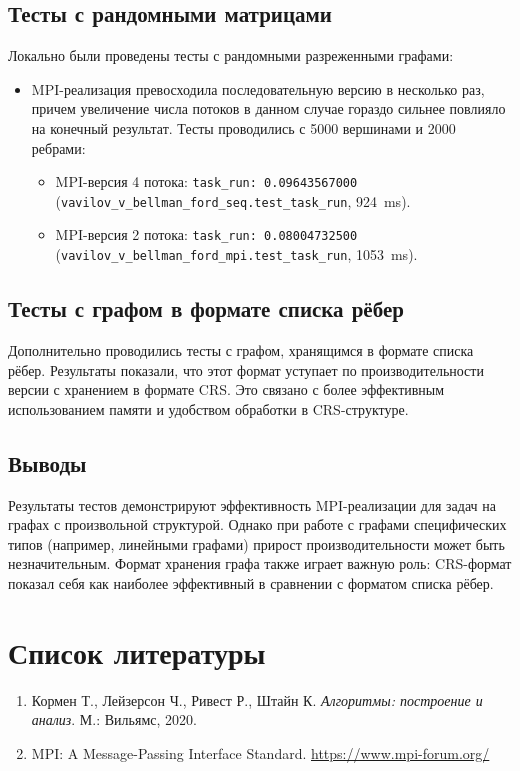 \documentclass[12pt]{article}
\begin{document}
\subsection{Тесты с рандомными матрицами}

Локально были проведены тесты с рандомными разреженными графами:
\begin{itemize}
    \item MPI-реализация превосходила последовательную версию в несколько раз, причем увеличение числа потоков в данном случае гораздо сильнее повлияло на конечный результат. Тесты проводились с 5000 вершинами и 2000 ребрами:
    \begin{itemize}
        \item MPI-версия 4 потока: \texttt{task\_run: 0.09643567000} (\texttt{vavilov\_v\_bellman\_ford\_seq.test\_task\_run}, 924~ms).
        \item MPI-версия 2 потока: \texttt{task\_run: 0.08004732500} (\texttt{vavilov\_v\_bellman\_ford\_mpi.test\_task\_run}, 1053~ms).
    \end{itemize}
    
\end{itemize}

\subsection{Тесты с графом в формате списка рёбер}

Дополнительно проводились тесты с графом, хранящимся в формате списка рёбер. Результаты показали, что этот формат уступает по производительности версии с хранением в формате CRS. Это связано с более эффективным использованием памяти и удобством обработки в CRS-структуре.

\subsection{Выводы}

Результаты тестов демонстрируют эффективность MPI-реализации для задач на графах с произвольной структурой. Однако при работе с графами специфических типов (например, линейными графами) прирост производительности может быть незначительным. Формат хранения графа также играет важную роль: CRS-формат показал себя как наиболее эффективный в сравнении с форматом списка рёбер.

\section{Список литературы}
\begin{enumerate}
\item Кормен Т., Лейзерсон Ч., Ривест Р., Штайн К. \textit{Алгоритмы: построение и анализ}. \newline М.: Вильямс, 2020.
\item MPI: A Message-Passing Interface Standard. \url{https://www.mpi-forum.org/}
\end{enumerate}
\end{document}
